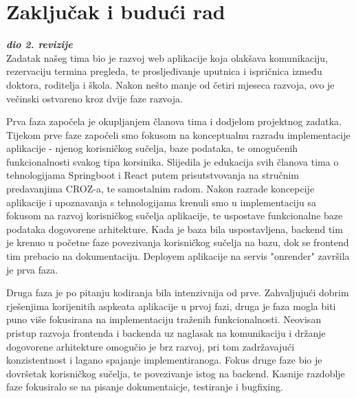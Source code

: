 \chapter{Zaključak i budući rad}
		
		\textbf{\textit{dio 2. revizije}}\\

			Zadatak našeg tima bio je razvoj web aplikacije koja olakšava komunikaciju, rezervaciju termina pregleda, te prosljeđivanje uputnica i ispričnica između doktora, roditelja i škola. Nakon nešto manje od četiri mjeseca razvoja, ovo je večinski ostvareno kroz dvije faze razvoja.
			
			Prva faza započela je okupljanjem članova tima i dodjelom projektnog zadatka. Tijekom prve faze započeli smo fokusom na konceptualnu razradu implementacije aplikacije - njenog korisničkog sučelja, baze podataka, te omogučenih funkcionalnosti svakog tipa korsinika.
			Slijedila je edukacija svih članova tima o tehnologijama Springboot i React putem prisutstvovanja na stručnim predavanjima CROZ-a, te samostalnim radom.
			Nakon razrade koncepcije aplikacije i upoznavanja s tehnologijama krenuli smo u implementaciju sa fokusom na razvoj korisničkog sučelja aplikacije, te uspostave funkcionalne baze podataka dogovorene arhitekture. Kada je baza bila uspostavljena, backend tim je krenuo u početne faze povezivanja korisničkog sučelja na bazu, dok se frontend tim prebacio na dokumentaciju.
			Deployem aplikacije na servis "onrender" završila je prva faza.

			Druga faza je po pitanju kodiranja bila intenzivnija od prve. Zahvaljujući dobrim rješenjima korijenitih aspkeata aplikacije u prvoj fazi, druga je faza mogla biti puno više fokusirana na implementaciju traženih funkcionalnosti.
			Neovisan pristup razvoja frontenda i backenda uz naglasak na komunikaciju i držanje dogovorene arhitekture omogučio je brz razvoj, pri tom zadržavajući konzistentnost i lagano spajanje implementiranoga.
			Fokus druge faze bio je dovršetak korisničkog sučelja, te povezivanje istog na backend. Kasnije razdoblje faze fokusiralo se na pisanje dokumentaicje, testiranje i bugfixing.

